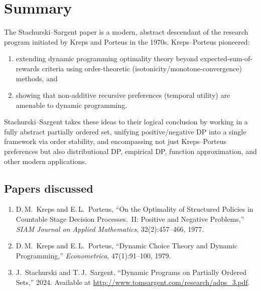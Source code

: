 \documentclass[12pt]{article}
\begin{document}
\section{Summary}

The Stachurski--Sargent paper is a modern, abstract descendant of the research program initiated by Kreps and Porteus in the 1970s. Kreps--Porteus pioneered:
\begin{enumerate}
\item[(a)] extending dynamic programming optimality theory beyond expected-sum-of-rewards criteria using order-theoretic (isotonicity/monotone-convergence) methods, and
\item[(b)] showing that non-additive recursive preferences (temporal utility) are amenable to dynamic programming.
\end{enumerate}

\noindent
Stachurski--Sargent takes these ideas to their logical conclusion by working in a fully abstract partially ordered set, unifying positive/negative DP into a single framework via order stability, and encompassing not just Kreps--Porteus preferences but also distributional DP, empirical DP, function approximation, and other modern applications.


\bigskip
\subsection*{Papers discussed}

\begin{enumerate}
\item D.\,M.\ Kreps and E.\,L.\ Porteus, ``On the Optimality of Structured Policies in Countable Stage Decision Processes.\ II: Positive and Negative Problems,'' \textit{SIAM Journal on Applied Mathematics}, 32(2):457--466, 1977.

\item D.\,M.\ Kreps and E.\,L.\ Porteus, ``Dynamic Choice Theory and Dynamic Programming,'' \textit{Econometrica}, 47(1):91--100, 1979.

\item J.\ Stachurski and T.\,J.\ Sargent, ``Dynamic Programs on Partially Ordered Sets,'' 2024. Available at \url{http://www.tomsargent.com/research/adps_3.pdf}.
\end{enumerate}
\end{document}

